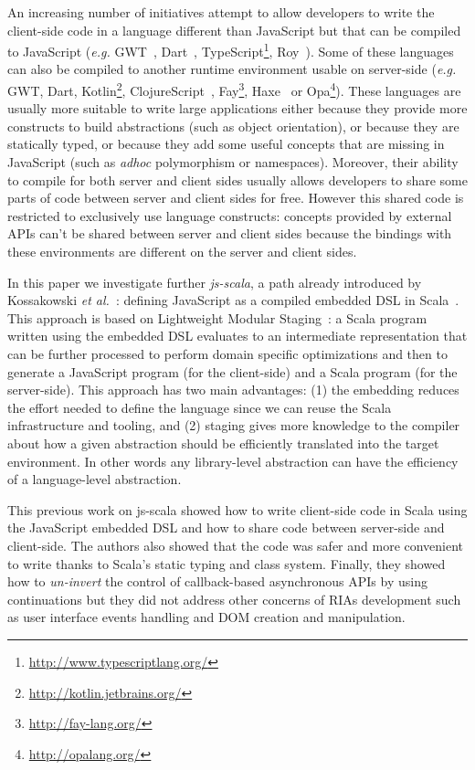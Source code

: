 \documentclass[american,english,runningheads]{llncs}
\newcommand{\eg}{\emph{e.g.}}
\newcommand{\etal}{\emph{et al.~}}
\begin{document}
An increasing number of initiatives attempt to allow developers to write the client-side code in a language different
than JavaScript but that can be compiled to JavaScript (\eg{} GWT~\cite{Chaganti07_GWT}, Dart~\cite{Griffith11_Dart},
TypeScript\footnote{\href{http://www.typescriptlang.org/}{http://www.typescriptlang.org/}}, Roy~\cite{McKenna_Roy}).
Some of these languages can also be compiled to another runtime environment usable on server-side (\eg{} GWT, Dart,
Kotlin\footnote{\href{http://kotlin.jetbrains.org/}{http://kotlin.jetbrains.org/}},
ClojureScript~\cite{McGranaghan11_ClojureScript}, Fay\footnote{\href{http://fay-lang.org/}{http://fay-lang.org/}},
Haxe~\cite{Cannasse08_HaXe} or Opa\footnote{\href{http://opalang.org/}{http://opalang.org/}}). These languages are
usually more suitable to write large applications either because they provide more constructs to build abstractions
(such as object orientation), or because they are statically typed, or because they add some useful concepts
that are missing in JavaScript (such as \emph{adhoc} polymorphism or namespaces). Moreover, their ability to compile
for both server and client sides usually allows developers to share some parts of code between server and client
sides for free. However this shared code is restricted to exclusively use language constructs: concepts provided by
external APIs can't be shared between server and client sides because the bindings with these environments are
different on the server and client sides.

In this paper we investigate further \emph{js-scala}, a path already introduced by Kossakowski \etal{}: defining
JavaScript as a compiled embedded DSL in Scala~\cite{Kossakowski12_JsDESL}. This approach is based on Lightweight
Modular Staging~\cite{Rompf12_LMSThesis}: a Scala program written using the embedded DSL evaluates to an intermediate
representation that can be further processed to perform domain specific optimizations and then to generate a
JavaScript program (for the client-side) and a Scala program (for the server-side). This approach has two main
advantages: (1) the embedding reduces the effort needed to define the language since we can reuse the Scala
infrastructure and tooling, and (2) staging gives more knowledge to the compiler about how a given abstraction
should be efficiently translated into the target environment. In other words any library-level abstraction can have
the efficiency of a language-level abstraction.

This previous work on js-scala showed how to write client-side code in Scala using the JavaScript embedded DSL and
how to share code between server-side and client-side. The authors also showed that the code was safer and more
convenient to write thanks to Scala's static typing and class system. Finally, they showed how to \emph{un-invert}
the control of callback-based asynchronous APIs by using continuations but they did not address other concerns of
RIAs development such as user interface events handling and DOM creation and manipulation.
\end{document}
